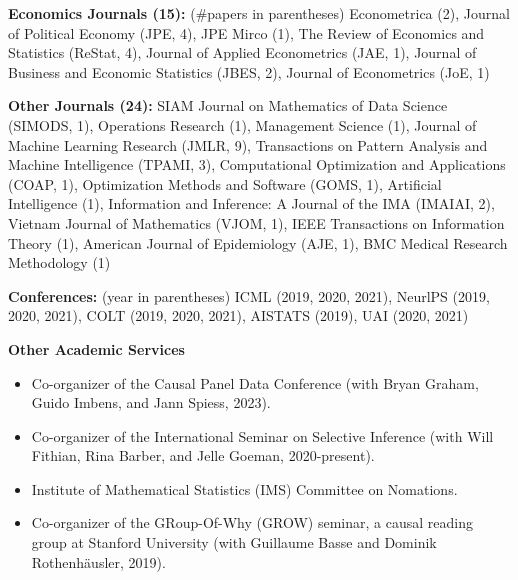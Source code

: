 \documentclass{article}
\newcommand{\red}[1]{{\color{red} #1}}
\begin{document}
\vspace{2mm}
\noindent \textbf{Economics Journals (15): }(\#papers in parentheses) Econometrica (2), Journal of Political Economy (JPE, 4), JPE Mirco (1), The Review of Economics and Statistics (ReStat, 4), Journal of Applied Econometrics (JAE, 1), Journal of Business and Economic Statistics (JBES, 2), Journal of Econometrics (JoE, 1)

\vspace{2mm}
\noindent \textbf{Other Journals (24): } SIAM Journal on Mathematics of Data Science (SIMODS, 1), Operations Research (1), Management Science (1), Journal of Machine Learning Research (JMLR, 9), Transactions on Pattern Analysis and Machine Intelligence (TPAMI, 3), Computational Optimization and Applications (COAP, 1), Optimization Methods and Software (GOMS, 1), Artificial Intelligence (1), Information and Inference: A Journal of the IMA (IMAIAI, 2), Vietnam Journal of Mathematics (VJOM, 1), IEEE Transactions on Information Theory (1), American Journal of Epidemiology (AJE, 1), BMC Medical Research Methodology (1)

\vspace{2mm}
\noindent \textbf{Conferences: }(year in parentheses) ICML (2019, 2020, 2021), NeurlPS (2019, 2020, 2021), COLT (2019, 2020, 2021), AISTATS (2019), UAI (2020, 2021)

\vspace{7mm}
\begin{large}
\noindent \textbf{Other Academic Services}
\end{large}

\begin{itemize}
\item \red{Co-organizer of the Causal Panel Data Conference (with Bryan Graham, Guido Imbens, and Jann Spiess, 2023).}
\item Co-organizer of the International Seminar on Selective Inference (with Will Fithian, Rina Barber, and Jelle Goeman, 2020-present).
\item Institute of Mathematical Statistics (IMS) Committee on Nomations.
\item Co-organizer of the GRoup-Of-Why (GROW) seminar, a causal reading group at Stanford University (with Guillaume Basse and Dominik Rothenhäusler, 2019).
\end{itemize}
\end{document}
